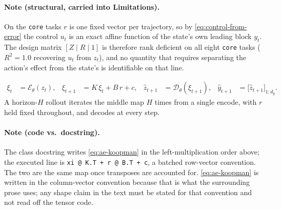 \paragraph{Note (structural, carried into Limitations).}
On the \texttt{core} tasks $r$ is one fixed vector per trajectory, so by
\eqref{eq:control-from-error} the control $u_t$ is an exact affine function of the state's
own leading block $y_t$. The design matrix $[Z \mid R \mid 1]$ is therefore rank deficient on
all eight \texttt{core} tasks ($R^2 = 1.0$ recovering $u_t$ from $z_t$), and no quantity that
requires separating the action's effect from the state's is identifiable on that line.

\begin{align}
  \xi_t &= \mathcal{E}_\theta(z_t), &
  \xi_{t+1} &= K\,\xi_t + B\,r + c, &
  \hat z_{t+1} &= \mathcal{D}_\theta(\xi_{t+1}), &
  \hat y_{t+1} &= \bigl[\hat z_{t+1}\bigr]_{1:d_y}.
  \label{eq:ae-koopman}
\end{align}
%
\noindent A horizon-$H$ rollout iterates the middle map $H$ times from a single encode, with
$r$ held fixed throughout, and decodes at every step.

\paragraph{Note (code vs.\ docstring).}
The class docstring writes \eqref{eq:ae-koopman} in the left-multiplication order above; the
executed line is \texttt{xi @ K.T + r @ B.T + c}, a batched row-vector convention. The two are
the same map once transposes are accounted for. \eqref{eq:ae-koopman} is written in the
column-vector convention because that is what the surrounding prose uses; any shape claim in
the text must be stated for that convention and not read off the tensor code.

